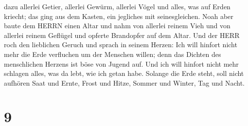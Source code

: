  dazu allerlei Getier, allerlei Gewürm, allerlei Vögel und
alles, was auf Erden kriecht; das ging aus dem Kasten, ein jegliches mit
seinesgleichen.  Noah aber baute dem HERRN einen Altar und
nahm von allerlei reinem Vieh und von allerlei reinem Geflügel und
opferte Brandopfer auf dem Altar.  Und der HERR roch den
lieblichen Geruch und sprach in seinem Herzen: Ich will hinfort nicht
mehr die Erde verfluchen um der Menschen willen; denn das Dichten des
menschlichen Herzens ist böse von Jugend auf. Und ich will hinfort nicht
mehr schlagen alles, was da lebt, wie ich getan habe. 
Solange die Erde steht, soll nicht aufhören Saat und Ernte, Frost und
Hitze, Sommer und Winter, Tag und Nacht.

\hypertarget{section-8}{%
\section{9}\label{section-8}}

